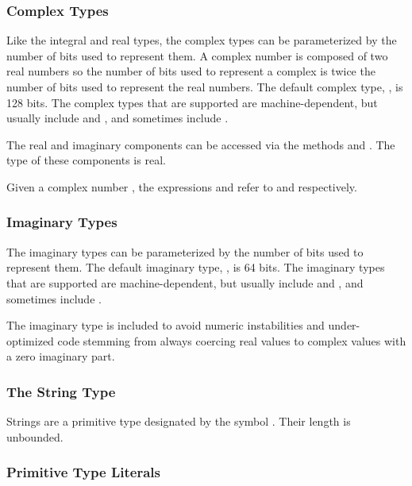 \subsubsection{Complex Types}
\label{Complex_Types}

Like the integral and real types, the complex types can be
parameterized by the number of bits used to represent them.  A complex
number is composed of two real numbers so the number of bits used to
represent a complex is twice the number of bits used to represent the
real numbers.  The default complex type, , is 128 bits.
The complex types that are supported are machine-dependent, but
usually include  and , and
sometimes include .

The real and imaginary components can be accessed via the methods
 and .  The type of these components is real.

\begin{example}
Given a complex number , the expressions
 and  refer to  and 
respectively.
\end{example}

\subsubsection{Imaginary Types}
\label{Imaginary_Types}

The imaginary types can be parameterized by the number of bits used to
represent them.  The default imaginary type, , is 64 bits.
The imaginary types that are supported are machine-dependent, but
usually include  and , and sometimes
include .

\begin{rationale}
The imaginary type is included to avoid numeric instabilities and
under-optimized code stemming from always coercing real values to
complex values with a zero imaginary part.
\end{rationale}

\subsubsection{The String Type}
\label{The_String_Type}

Strings are a primitive type designated by the symbol .
Their length is unbounded.

\subsubsection{Primitive Type Literals}
\label{Primitive_Type_Literals}

